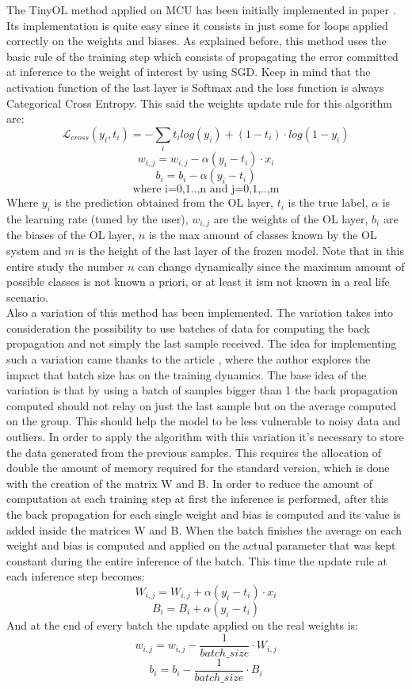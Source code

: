 \documentclass[12pt]{report}
\begin{document}
The TinyOL method applied on MCU has been initially implemented in paper \cite{ren2021tinyol}. Its implementation is quite easy since it consists in just some for loops applied correctly on the weights and biases. As explained before, this method uses the basic rule of the training step which consists of propagating the error committed at inference to the weight of interest by using SGD. Keep in mind that the activation function of the last layer is Softmax and the loss function is always Categorical Cross Entropy. This said the weights update rule for this algorithm are:
%
\[ \mathcal{L}_{cross}(y_i, t_i)= - \sum_i t_i log(y_i) + (1-t_i)\cdot log(1-y_i)  \]
\[    w_{i,j} = w_{i,j} - \alpha (y_i - t_i) \cdot x_i \]
\[    b_i = b_i - \alpha (y_i - t_i) \]
\[    \text{where i=0,1..,n  and  j=0,1,..,m} \]
%
Where $y_i$ is the prediction obtained from the OL layer, $t_i$ is the true label, $\alpha$ is the learning rate (tuned by the user), $w_{i,j}$ are the weights of the OL layer, $b_i$ are the biases of the OL layer, $n$ is the max amount of classes known by the OL system and $m$ is the height of the last layer of the frozen model. Note that in this entire study the number $n$ can change dynamically since the maximum amount of possible classes is not known a priori, or at least it ism not known in a real life scenario. \\
Also a variation of this method has been implemented. The variation takes into consideration the possibility to use batches of data for computing the back propagation and not simply the last sample received. The idea for implementing such a variation came thanks to the article \cite{batch_size_medium}, where the author explores the impact that batch size has on the training dynamics. The base idea of the variation is that by using a batch of samples bigger than 1 the back propagation computed should not relay on just the last sample but on the average computed on the group. This should help the model to be less vulnerable to noisy data and outliers. In order to apply the algorithm with this variation it's necessary to store the data generated from the previous samples. This requires the allocation of double the amount of memory required for the standard version, which is done with the creation of the matrix W and B. In order to reduce the amount of computation at each training step at first the inference is performed, after this the back propagation for each single weight and bias is computed and its value is added inside the matrices W and B. When the batch finishes the average on each weight and bias is computed and applied on the actual parameter that was kept constant during the entire inference of the batch. This time the update rule at each inference step becomes:
    \[     W_{i,j} = W_{i,j} + \alpha (y_i - t_i) \cdot x_i\]
    \[     B_i = B_i + \alpha  (y_i - t_i) \]
And at the end of every batch the update applied on the real weights is:
    \[     w_{i,j} = w_{i,j} - \frac{1}{batch\_size} \cdot W_{i,j} \] 
    \[     b_i = b_i - \frac{1}{batch\_size} \cdot B_i \]
    
\end{document}
